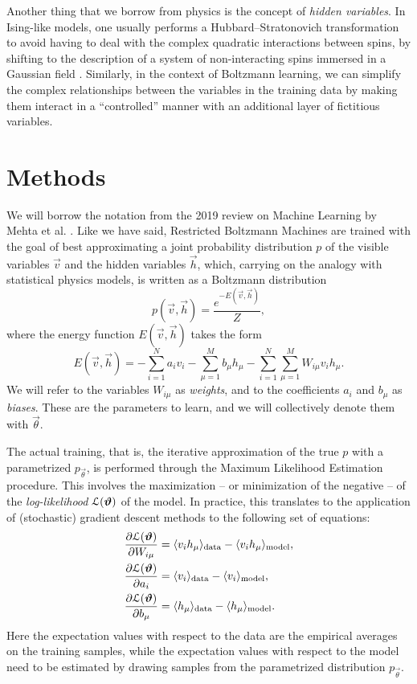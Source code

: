 \documentclass[prl, twocolumn]{revtex4-2}
\begin{document}
Another thing that we borrow from physics is the concept of \emph{hidden variables}. In Ising-like models, one usually performs a Hubbard–Stratonovich transformation to avoid having to deal with the complex quadratic interactions between spins, by shifting to the description of a system of non-interacting spins immersed in a Gaussian field \cite{Hubbard1959}. Similarly, in the context of Boltzmann learning, we can simplify the complex relationships between the variables in the training data by making them interact in a “controlled” manner with an additional layer of fictitious variables. 
\section{Methods}
We will borrow the notation from the 2019 review on Machine Learning by Mehta et al. \cite{Mehta2019}. Like we have said, Restricted Boltzmann Machines are trained with the goal of best approximating a joint probability distribution $p$ of the visible variables $\vec{v}$ and the hidden variables $\vec{h}$, which, carrying on the analogy with statistical physics models, is written as a Boltzmann distribution
\begin{equation}
    p(\vec{v}, \vec{h}) = \frac{e^{-E(\vec{v}, \vec{h})}}{Z},
\end{equation}
where the energy function $E(\vec{v}, \vec{h})$ takes the form
\begin{equation}
    E(\vec{v}, \vec{h}) = - \sum_{i = 1}^{N} a_i v_i - \sum_{\mu = 1}^{M} b_\mu h_\mu - \sum_{i = 1}^{N} \sum_{\mu = 1}^{M} W_{i \mu} v_i h_\mu.
\end{equation}
We will refer to the variables $W_{i\mu}$ as \emph{weights}, and to the coefficients $a_i$ and $b_\mu$ as \emph{biases}. These are the parameters to learn, and we will collectively denote them with $\vec{\theta}$.

The actual training, that is, the iterative approximation of the true $p$ with a parametrized $p_{\vec{\theta}}$, is performed through the Maximum Likelihood Estimation procedure. This involves the maximization – or minimization of the negative – of the \emph{log-likelihood} $\mathcal{L}(\bm{\vartheta})$ of the model. In practice, this translates to the application of (stochastic) gradient descent methods to the following set of equations:
\begin{align}
    \pdiff{\logL(\vec{\theta})}{W_{i\mu}} &= \expval{v_i h_\mu}_{\mathrm{data}} - \expval{v_i h_\mu}_{\mathrm{model}}, \label{eq:dL_dW} \\
    \pdiff{\logL(\vec{\theta})}{a_i} &= \expval{v_i}_{\mathrm{data}} - \expval{v_i}_{\mathrm{model}}, \label{eq:dL_da} \\
    \pdiff{\logL(\vec{\theta})}{b_\mu} &= \expval{h_\mu}_{\mathrm{data}} - \expval{h_\mu}_{\mathrm{model}}. \label{eq:dL_db}
\end{align}
Here the expectation values with respect to the data are the empirical averages on the training samples, while the expectation values with respect to the model need to be estimated by drawing samples from the parametrized distribution $p_{\vec{\theta}}$.
\end{document}
